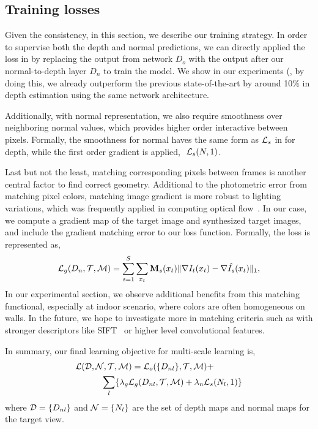 \subsection{Training losses}
\label{sub:training_losses}
\vspace{-0.3\baselineskip}

Given the consistency, in this section, we describe our training strategy. In order to supervise both the depth and normal predictions, we can directly applied the loss in  by replacing the output from network $D_o$ with the output after our normal-to-depth layer $D_n$ to train the model. We show in our experiments (, by doing this, we already outperform the previous state-of-the-art by around 10$\%$ in depth estimation using the same network architecture.

Additionally, with normal representation, we also require smoothness over neighboring normal values, which provides higher order interactive between pixels. Formally, the smoothness for normal haves the same form as ${\mathcal L}_{s}$ in  for depth, while the first order gradient is applied, \ie $~{\mathcal L}_{s}(N, 1)$. 

Last but not the least, matching corresponding pixels between frames is another central factor to find correct geometry. Additional to the photometric error from matching pixel colors, matching image gradient is more robust to lighting variations, which was frequently applied in computing optical flow~\cite{li2017pyramidal}. 
In our case, we compute a gradient map of the target image and synthesized target images, and include the gradient matching error to our loss function. Formally, the loss is represented as,
\begin{equation}
\label{equ:gradient}
{\mathcal L}_{g}(D_n, {\mathcal T}, {\mathcal M}) = \sum_{s=1}^{S}\sum_{x_t}{\mathbf M}_s(x_t)\|\nabla I_t(x_t) - \nabla \hat{I_s}(x_t)\|_1, \nonumber
\end{equation}
In our experimental section, we observe additional benefits from this matching functional, especially at indoor scenario, where colors are often homogeneous on walls.
In the future, we hope to investigate more in matching criteria such as with stronger descriptors like SIFT~\cite{liu2011sift} or higher level convolutional features.

In summary, our final learning objective for multi-scale learning is,
\begin{align}
\label{eq:full_loss}
&{\mathcal L}({\mathcal D}, {\mathcal N}, {\mathcal T}, {\mathcal M}) = {\mathcal L}_{o}(\{D_{nl}\}, {\mathcal T}, {\mathcal M}) + \nonumber\\
&\text{~~~~~~~~~}\sum_l\{\lambda_g{\mathcal L}_{g}(D_{nl},{\mathcal T},{\mathcal M}) + \lambda_n{\mathcal L}_{s}(N_l, 1)\}
\end{align}
where ${\mathcal D} = \{D_{nl}\}$ and ${\mathcal N} = \{N_{l}\}$ are the set of depth maps and normal maps for the target view.

